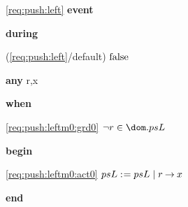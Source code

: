 \noindent \ref{req:push:left}  \textbf{event}
\begin{block}
  \item   \textbf{during}
  \begin{block}
  \item[ (\ref{req:push:left}/default) ]{$\text{false} $} %
  \end{block}
  \item   \textbf{any} r,x
  \item   \textbf{when}
  \begin{block}
  \item[ \eqref{req:push:leftm0:grd0} ]{$\neg r \in \dom.psL $} %
  \end{block}
  \item   \textbf{begin}
  \begin{block}
  \item[ \eqref{req:push:leftm0:act0} ]{$psL \mathrel{:\mkern1mu=} psL \; | \; r \mathbin\rightarrow x $} %
  \end{block}
  \item   \textbf{end} \\
\end{block}
